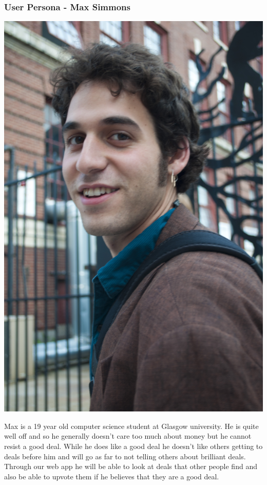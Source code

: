 \documentclass{beamer}
\begin{document}
\begin{frame}
	\frametitle{User Persona - Max Simmons}
	\begin{center}
		\includegraphics[height=.3\textheight]{persona/max.png}
	\end{center}
	Max is a 19 year old computer science student at Glasgow university.  He is quite well off and so he generally doesn’t care too much about money but he cannot resist a good deal. While he does like a good deal he doesn't like others getting to deals before him and will go as far to not telling others about brilliant deals. Through our web app he will be able to look at deals that other people find and also be able to upvote them if he believes that they are a good deal.
\end{frame}
\end{document}
